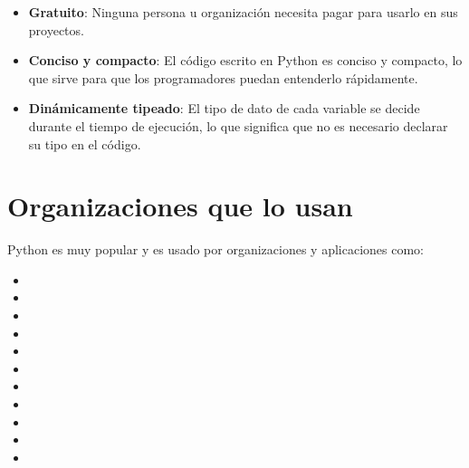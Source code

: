 \begin{itemize}
  \item \textbf{Gratuito}: Ninguna persona u organización necesita pagar para usarlo en sus proyectos.
  
  \item \textbf{Conciso y compacto}: El código escrito en Python es conciso y compacto, lo que sirve para que los programadores puedan entenderlo rápidamente.
  
  \item \textbf{Dinámicamente tipeado}: El tipo de dato de cada variable se decide durante el tiempo de ejecución, lo que significa que no es necesario declarar su tipo en el código.
  
\end{itemize}

\section{Organizaciones que lo usan}

Python es muy popular y es usado por organizaciones y aplicaciones como:

\begin{itemize}
  \item {}

  \item {}
  
  \item {}
  
  \item {}
  
  \item {}
  
  \item {}
  
  \item {}
  
  \item {}

  \item {}
  
  \item {}
  
  \item {}
  
\end{itemize}

